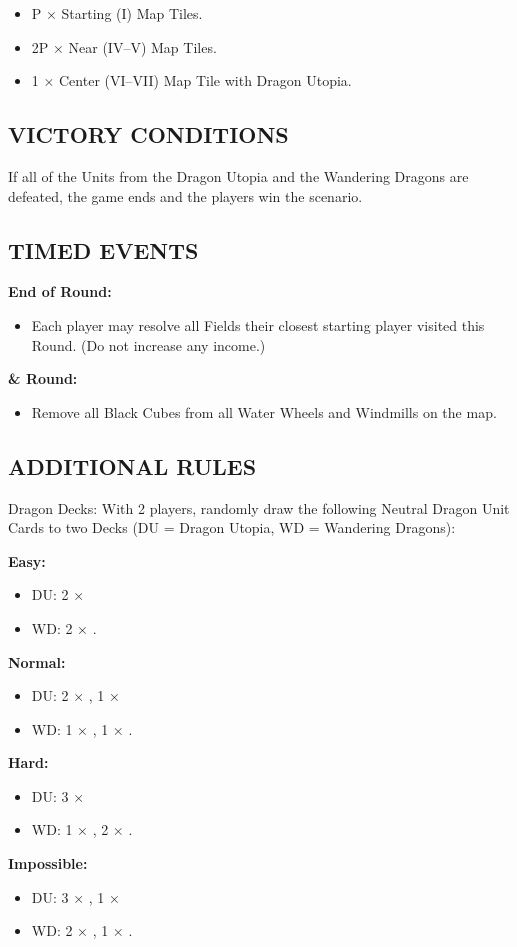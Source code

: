 \begin{multicols*}{2}
\begin{itemize}
  \item P × Starting (I) Map Tiles.
  \item 2P × Near (IV–V) Map Tiles.
  \item 1 × Center (VI–VII) Map Tile with Dragon Utopia.
\end{itemize}

\subsection*{\MakeUppercase{Victory Conditions}}
If all of the Units from the Dragon Utopia and the Wandering Dragons are defeated, the game ends and the players win the scenario.

\subsection*{\MakeUppercase{Timed Events}}
\textbf{End of  Round:}
\begin{itemize}
  \item Each player may resolve all Fields their closest starting player visited this Round. (Do not increase any income.)
\end{itemize}
\textbf{ \&  Round:}
\begin{itemize}
  \item Remove all Black Cubes from all Water Wheels and Windmills on the map.
\end{itemize}

\subsection*{\MakeUppercase{Additional Rules}}
Dragon Decks: With 2 players, randomly draw the following Neutral Dragon Unit Cards to two Decks (DU = Dragon Utopia, WD = Wandering Dragons):

\textbf{Easy:}
\begin{itemize}
  \item DU: 2 × \azure\
  \item WD: 2 × \golden.
\end{itemize}
\textbf{Normal:}
\begin{itemize}
  \item DU: 2 × \azure, 1 × \golden\
  \item WD: 1 × \azure, 1 × \golden.
\end{itemize}
\textbf{Hard:}
\begin{itemize}
  \item DU: 3 × \azure\
  \item WD: 1 × \azure, 2 × \golden.
\end{itemize}
\textbf{Impossible:}
\begin{itemize}
  \item DU: 3 × \azure, 1 × \golden\
  \item WD: 2 × \azure, 1 × \golden.
\end{itemize}


\end{multicols*}
